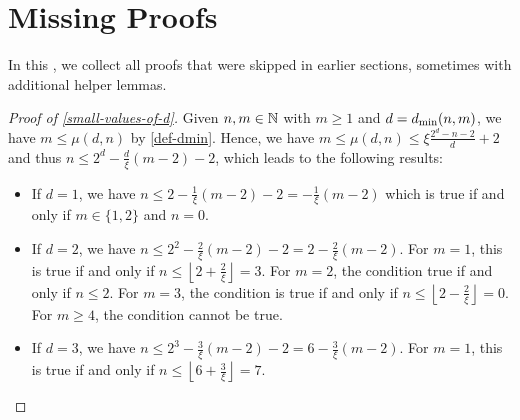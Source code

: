 \section{Missing Proofs} \label{app-proofs}

In this ,
we collect all proofs that were skipped in
earlier sections,
sometimes with additional helper lemmas.

\begin{proof}[Proof of \cref{small-values-of-d}] \label{proof-small-values-of-d}
Given $n, m \in \mathbb N$ with $m \geq 1$
and $d = d_{\min}(n, m)$, we have $m \leq \mu(d, n)$
by \cref{def-dmin}.
Hence,  we have $m \leq \mu(d, n) \leq \xi \frac{2^d - n - 2}{d} + 2$
and thus $n \leq 2^d - \frac{d}{\xi}(m-2) - 2$, which leads to the following results:
\begin{itemize}
   \item If $d = 1$, we have $n \leq 2 - \frac{1}{\xi}(m-2) - 2 = - \frac{1}{\xi}(m-2)$ which is true if and
     only if $m \in \{1,2\}$ and $n=0$.
   \item If $d = 2$, we have  $n \leq 2^2 - \frac{2}{\xi}(m-2) - 2 = 2 - \frac{2}{\xi}(m-2)$. For $m=1$,
     this is true if and only if $n \leq \left \lfloor 2 + \frac{2}{\xi} \right\rfloor = 3$. For $m=2$,
     the condition true if and only if $n \leq 2$. For $m=3$, the condition is true if and only if 
     $n \leq \left \lfloor 2 - \frac{2}{\xi} \right\rfloor = 0$. For $m \geq 4$, the condition cannot be true.
   \item If $d = 3$, we have  $n \leq 2^3 - \frac{3}{\xi}(m-2) - 2 = 6 - \frac{3}{\xi}(m-2)$. 
     For $m=1$, this is true if and only if $n \leq \left \lfloor 6 + \frac{3}{\xi} \right\rfloor = 7$.

\end{itemize}
\end{proof}
